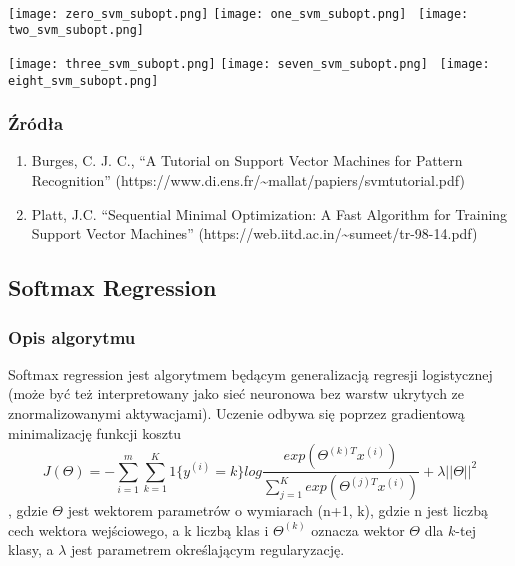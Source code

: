 \documentclass[11pt]{article}
\providecommand{\tightlist}{%
      \setlength{\itemsep}{0pt}\setlength{\parskip}{0pt}}
\begin{document}
\\


\texttt{[image: zero\_svm\_subopt.png]}
\endminipage\hfill {}
\texttt{[image: one\_svm\_subopt.png]}
\endminipage\hfill {}\
\texttt{[image: two\_svm\_subopt.png]} \endminipage


\texttt{[image: three\_svm\_subopt.png]}
\endminipage\hfill {}
\texttt{[image: seven\_svm\_subopt.png]}
\endminipage\hfill {}\
\texttt{[image: eight\_svm\_subopt.png]} \endminipage
\\

    \hypertarget{ux17aruxf3dux142a}{%
\subsubsection{Źródła}\label{ux17aruxf3dux142a}}

\begin{enumerate}
\def\labelenumi{\arabic{enumi}.}
\tightlist
\item
  Burges, C. J. C., ``A Tutorial on Support Vector Machines for Pattern
  Recognition''
  (https://www.di.ens.fr/\textasciitilde mallat/papiers/svmtutorial.pdf)
\item
  Platt, J.C. ``Sequential Minimal Optimization: A Fast Algorithm for
  Training Support Vector Machines''
  (https://web.iitd.ac.in/\textasciitilde sumeet/tr-98-14.pdf)
\end{enumerate}
\clearpage
    \hypertarget{softmax-regression}{%
\subsection{Softmax Regression}\label{softmax-regression}}

\hypertarget{opis-algorytmu}{%
\subsubsection{Opis algorytmu}\label{opis-algorytmu}}

Softmax regression jest algorytmem będącym generalizacją regresji
logistycznej (może być też interpretowany jako sieć neuronowa bez warstw
ukrytych ze znormalizowanymi aktywacjami). Uczenie odbywa się poprzez
gradientową minimalizację funkcji kosztu
\[ J(\Theta) = - \sum^m_{i=1} \sum^K_{k=1} 1\{y^{(i)} = k\} log \frac{exp(\Theta^{(k)T}x^{(i)})}{\sum^K_{j=1}exp(\Theta^{(j)T}x^{(i)})} + \lambda ||\Theta||^2 \],
gdzie \(\Theta\) jest wektorem parametrów o wymiarach (n+1, k), gdzie n
jest liczbą cech wektora wejściowego, a k liczbą klas i \(\Theta^{(k)}\)
oznacza wektor \(\Theta\) dla \(k\)-tej klasy, a \(\lambda\) jest
parametrem określającym regularyzację.
\end{document}
